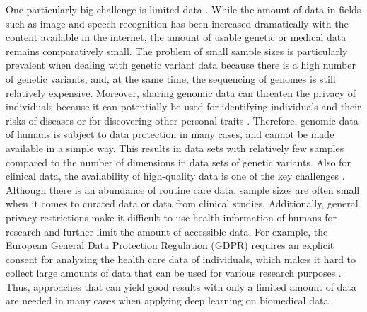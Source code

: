 \documentclass[12pt]{article}
\begin{document}
One particularly big challenge is limited data \citep{min_deep_2017}.
While the amount of data in fields such as image and speech recognition has been increased dramatically with the content available in the internet, the amount of usable genetic or medical data remains comparatively small.
The problem of small sample sizes is particularly prevalent when dealing with genetic variant data
because there is a high number of genetic variants, and, at the same time, the sequencing of genomes is still relatively expensive.
Moreover, sharing genomic data can threaten the privacy of individuals because it can potentially be used for identifying individuals and their risks of diseases or for discovering other personal traits \citep{bonomi_privacy_2020}.
Therefore, genomic data of humans is subject to data protection in many cases, and cannot be made available in a simple way.
This results in data sets with relatively few samples compared to the number of dimensions in data sets of genetic variants.
Also for clinical data, the availability of high-quality data is one of the key challenges \citep{machine_learning_review_nejm}.
Although there is an abundance of routine care data, sample sizes are often small when it comes to curated data or data from clinical studies.
Additionally, general privacy restrictions make it difficult to use health information of humans for research and further limit the amount of accessible data.
For example, the European General Data Protection Regulation (GDPR) requires an explicit consent for analyzing the health care data of individuals, which makes it hard to collect large amounts of data that can be used for various research purposes \citep{rumbold_effect_2017, shabani_re-identifiability_2019}.
Thus, approaches that can yield good results with only a limited amount of data are needed in many cases when applying deep learning on biomedical data.
\end{document}
